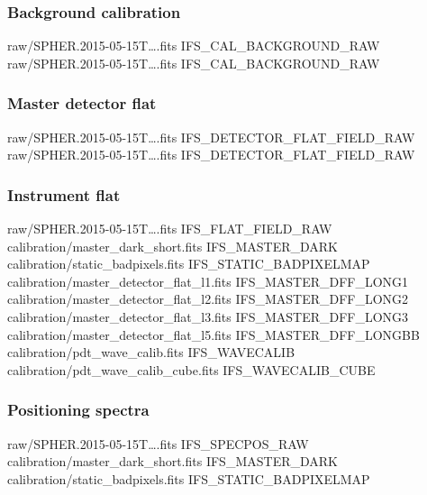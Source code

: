 \documentclass[twoside,single,12pt]{lion-msc}
\begin{document}
\subsubsection*{Background calibration}
\begin{mdframed}[linewidth = 0.3mm, linecolor = black]
raw/SPHER.2015-05-15T\dots.fits IFS\_CAL\_BACKGROUND\_RAW\\
raw/SPHER.2015-05-15T\dots.fits IFS\_CAL\_BACKGROUND\_RAW
\end{mdframed}

\subsubsection*{Master detector flat}
\begin{mdframed}[linewidth = 0.3mm, linecolor = black]
raw/SPHER.2015-05-15T\dots.fits IFS\_DETECTOR\_FLAT\_FIELD\_RAW\\
raw/SPHER.2015-05-15T\dots.fits IFS\_DETECTOR\_FLAT\_FIELD\_RAW
\end{mdframed}

\subsubsection*{Instrument flat}
\begin{mdframed}[linewidth = 0.3mm, linecolor = black]
raw/SPHER.2015-05-15T\dots.fits IFS\_FLAT\_FIELD\_RAW\\
calibration/master\_dark\_short.fits IFS\_MASTER\_DARK\\
calibration/static\_badpixels.fits IFS\_STATIC\_BADPIXELMAP\\
calibration/master\_detector\_flat\_l1.fits IFS\_MASTER\_DFF\_LONG1\\
calibration/master\_detector\_flat\_l2.fits IFS\_MASTER\_DFF\_LONG2\\
calibration/master\_detector\_flat\_l3.fits IFS\_MASTER\_DFF\_LONG3\\
calibration/master\_detector\_flat\_l5.fits IFS\_MASTER\_DFF\_LONGBB\\
calibration/pdt\_wave\_calib.fits IFS\_WAVECALIB\\
calibration/pdt\_wave\_calib\_cube.fits IFS\_WAVECALIB\_CUBE
\end{mdframed}

\subsubsection*{Positioning spectra}
\begin{mdframed}[linewidth = 0.3mm, linecolor = black]
raw/SPHER.2015-05-15T\dots.fits IFS\_SPECPOS\_RAW\\
calibration/master\_dark\_short.fits IFS\_MASTER\_DARK\\
calibration/static\_badpixels.fits IFS\_STATIC\_BADPIXELMAP
\end{mdframed}
\end{document}
